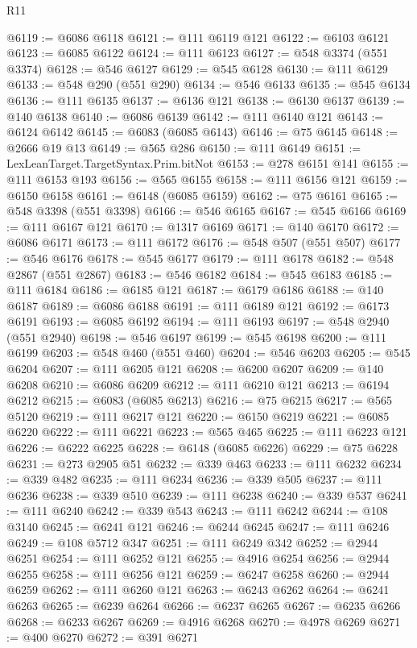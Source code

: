 \begin{lexlean}{R11}
\begin{coremodule}
{{{{{{{{{{{{{{{{{{{{{{{{{{{{{{{{{{{{{{{{{{{{{{{{{{{{{{{{{{{{{{{{{{{{{{{{{{{{{{{{{{@6119 := @6086 @6118
@6121 := @111 @6119 @121
@6122 := @6103 @6121
@6123 := @6085 @6122
@6124 := @111 @6123
@6127 := @548 @3374 (@551 @3374)
@6128 := @546 @6127
@6129 := @545 @6128
@6130 := @111 @6129
@6133 := @548 @290 (@551 @290)
@6134 := @546 @6133
@6135 := @545 @6134
@6136 := @111 @6135
@6137 := @6136 @121
@6138 := @6130 @6137
@6139 := @140 @6138
@6140 := @6086 @6139
@6142 := @111 @6140 @121
@6143 := @6124 @6142
@6145 := @6083 (@6085 @6143)
@6146 := @75 @6145
@6148 := @2666 @19 @13
@6149 := @565 @286
@6150 := @111 @6149
@6151 := LexLeanTarget.TargetSyntax.Prim.bitNot
@6153 := @278 @6151 @141
@6155 := @111 @6153 @193
@6156 := @565 @6155
@6158 := @111 @6156 @121
@6159 := @6150 @6158
@6161 := @6148 (@6085 @6159)
@6162 := @75 @6161
@6165 := @548 @3398 (@551 @3398)
@6166 := @546 @6165
@6167 := @545 @6166
@6169 := @111 @6167 @121
@6170 := @1317 @6169
@6171 := @140 @6170
@6172 := @6086 @6171
@6173 := @111 @6172
@6176 := @548 @507 (@551 @507)
@6177 := @546 @6176
@6178 := @545 @6177
@6179 := @111 @6178
@6182 := @548 @2867 (@551 @2867)
@6183 := @546 @6182
@6184 := @545 @6183
@6185 := @111 @6184
@6186 := @6185 @121
@6187 := @6179 @6186
@6188 := @140 @6187
@6189 := @6086 @6188
@6191 := @111 @6189 @121
@6192 := @6173 @6191
@6193 := @6085 @6192
@6194 := @111 @6193
@6197 := @548 @2940 (@551 @2940)
@6198 := @546 @6197
@6199 := @545 @6198
@6200 := @111 @6199
@6203 := @548 @460 (@551 @460)
@6204 := @546 @6203
@6205 := @545 @6204
@6207 := @111 @6205 @121
@6208 := @6200 @6207
@6209 := @140 @6208
@6210 := @6086 @6209
@6212 := @111 @6210 @121
@6213 := @6194 @6212
@6215 := @6083 (@6085 @6213)
@6216 := @75 @6215
@6217 := @565 @5120
@6219 := @111 @6217 @121
@6220 := @6150 @6219
@6221 := @6085 @6220
@6222 := @111 @6221
@6223 := @565 @465
@6225 := @111 @6223 @121
@6226 := @6222 @6225
@6228 := @6148 (@6085 @6226)
@6229 := @75 @6228
@6231 := @273 @2905 @51
@6232 := @339 @463
@6233 := @111 @6232
@6234 := @339 @482
@6235 := @111 @6234
@6236 := @339 @505
@6237 := @111 @6236
@6238 := @339 @510
@6239 := @111 @6238
@6240 := @339 @537
@6241 := @111 @6240
@6242 := @339 @543
@6243 := @111 @6242
@6244 := @108 @3140
@6245 := @6241 @121
@6246 := @6244 @6245
@6247 := @111 @6246
@6249 := @108 @5712 @347
@6251 := @111 @6249 @342
@6252 := @2944 @6251
@6254 := @111 @6252 @121
@6255 := @4916 @6254
@6256 := @2944 @6255
@6258 := @111 @6256 @121
@6259 := @6247 @6258
@6260 := @2944 @6259
@6262 := @111 @6260 @121
@6263 := @6243 @6262
@6264 := @6241 @6263
@6265 := @6239 @6264
@6266 := @6237 @6265
@6267 := @6235 @6266
@6268 := @6233 @6267
@6269 := @4916 @6268
@6270 := @4978 @6269
@6271 := @400 @6270
@6272 := @391 @6271
}}}}}}}}}}}}}}}}}}}}}}}}}}}}}}}}}}}}}}}}}}}}}}}}}}}}}}}}}}}}}}}}}}}}}}}}}}}}}}}}}}
\end{coremodule}
\end{lexlean}
